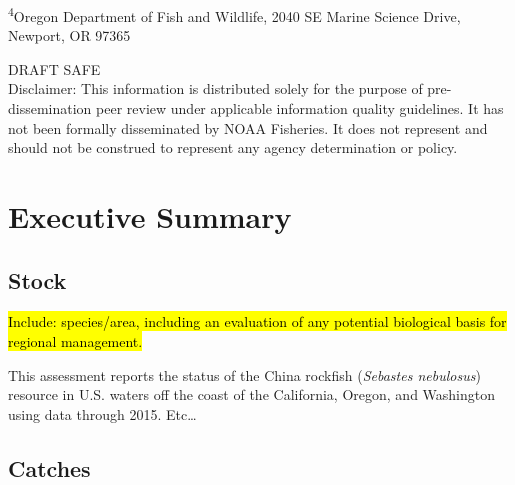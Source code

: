 \documentclass[12pt,]{article}
\begin{document}
\begin{center}
\vspace{.3cm}

\textsuperscript{4}Oregon Department of Fish and Wildlife, 2040 SE Marine Science Drive, Newport, OR 97365\\


\vspace{.5cm}

\vfill
DRAFT SAFE\\
Disclaimer: This information is distributed solely for the purpose of pre-dissemination
peer review under applicable information quality guidelines. It has not been formally
disseminated by NOAA Fisheries. It does not represent and should not be construed to
represent any agency determination or policy. 

\vspace{.3cm}

\maketitle

\setcounter{page}{1}
\end{center}

{
\setcounter{tocdepth}{4}
\tableofcontents
}
\setlength{\parskip}{5mm plus1mm minus1mm} \pagebreak

 \setcounter{page}{1}
\renewcommand{\thefigure}{\alph{figure}}
\renewcommand{\thetable}{\alph{table}}

\section*{Executive Summary}\label{executive-summary}

\subsection*{Stock}\label{stock}

\hl{Include: species/area, including an evaluation of any potential biological basis 
for regional management.}

This assessment reports the status of the China rockfish
(\emph{Sebastes nebulosus}) resource in U.S. waters off the coast of the
California, Oregon, and Washington using data through 2015. Etc\ldots{}

\subsection*{Catches}\label{catches}
\end{document}
